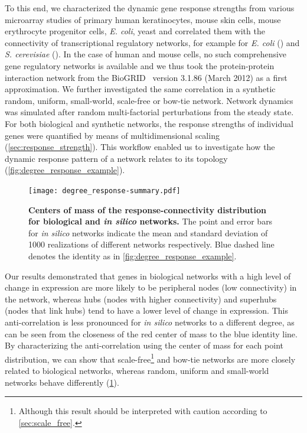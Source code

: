 To this end, we characterized the dynamic gene response strengths from 
various microarray studies of primary human keratinocytes, mouse skin
cells, mouse erythrocyte progenitor cells, \emph{E. coli}, yeast and
correlated them with the connectivity of
transcriptional regulatory networks, for example for \emph{E. coli} 
(\citealp{Gama-Castro2008}) 
and \emph{S. cerevisiae} (\citealp{Balaji2006}). In the case of human and
mouse cells, no such comprehensive gene regulatory networks is available
and we thus took the protein-protein interaction network from 
the BioGRID~%
\citep{Stark2006} version 3.1.86 (March 2012) as a first approximation. 
We further investigated the same correlation in a synthetic random,
uniform, small-world, scale-free or bow-tie network. Network dynamics was simulated after 
random 
multi-factorial perturbations from the steady state. 
For both biological and synthetic networks, the response 
strengths of individual genes were quantified by means of multidimensional 
scaling (\ref{sec:response_strength}). 
This workflow enabled us to investigate how the dynamic
response pattern of a network relates to its topology (\ref{fig:degree_response_example}). 

\begin{figure}[!ht]
\begin{center}
\texttt{[image: degree\_response-summary.pdf]}
\end{center}
\caption[Comparison between biological and \emph{in silico} networks]{
{\bf Centers of mass of the response-connectivity distribution for biological
and \emph{in silico} networks.} 
The point and error bars for \emph{in silico} networks indicate the mean
and standard deviation of 1000 realizations of different networks respectively.
Blue dashed line denotes the identity as in \ref{fig:degree_response_example}.
}
\label{fig:degree_response_summary}
\end{figure}

Our results demonstrated that genes in biological networks with a high level 
of change in expression are more likely to be peripheral nodes 
(low connectivity) in the network, whereas hubs (nodes with higher 
connectivity) and superhubs (nodes that link hubs) tend to have a lower level 
of change in expression. This anti-correlation is less pronounced for  
\emph{in silico} networks to a different degree, as can be seen from the closeness
of the red center of mass to the blue identity line. By characterizing the 
anti-correlation using the center of mass for each point distribution, we
can show that scale-free\footnote{Although this result should be interpreted 
with caution according to \ref{sec:scale_free}.} and bow-tie networks are more closely related to
biological networks, whereas random, uniform and small-world networks behave
differently (\ref{fig:degree_response_summary}).


